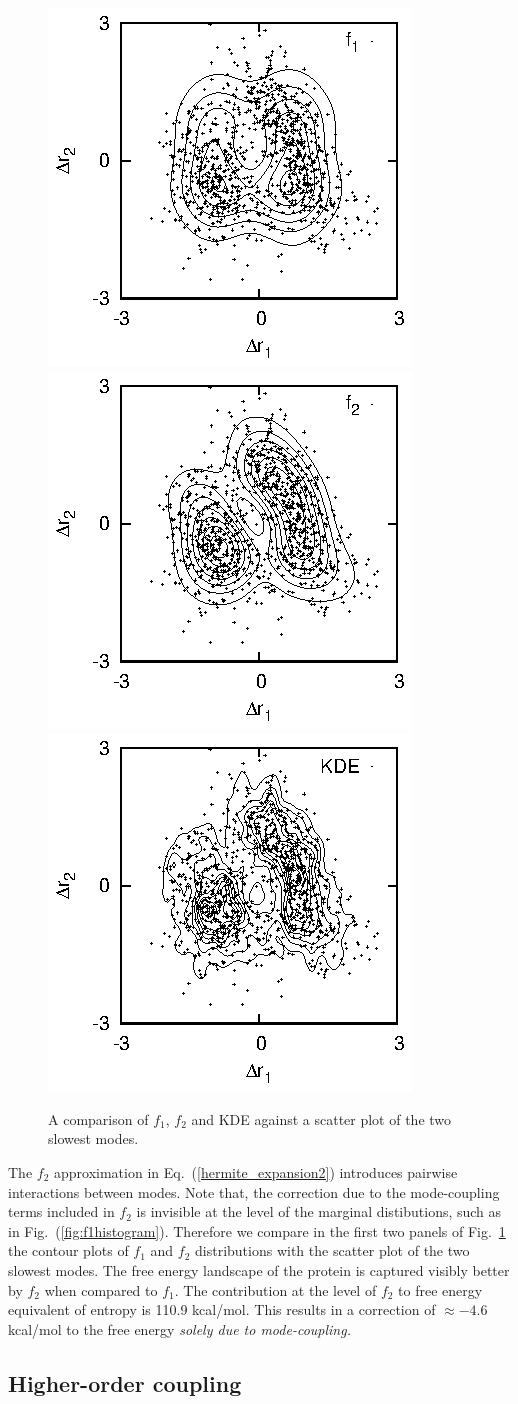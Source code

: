 \documentclass[12pt,article]{iopart}
\begin{document}
\begin{figure}[ht!]\centering
   \includegraphics[width=.30\textwidth]{fig4a.eps}
   \includegraphics[width=.30\textwidth]{fig4b.eps}
   \includegraphics[width=.30\textwidth]{fig4c.eps}
\caption{A comparison of $f_1$, $f_2$ and KDE against a scatter plot of the
  two slowest modes.}
\label{fig:contour}
\end{figure}

The $f_2$ approximation in Eq.~(\ref{hermite_expansion2}) introduces
pairwise interactions between modes. Note that, the correction due to
the mode-coupling terms included in $f_2$ is invisible at the level
of the marginal distibutions, such as in
Fig.~(\ref{fig:f1histogram}). Therefore we compare in the first two
panels of Fig.~\ref{fig:contour} the contour plots of $f_1$ and
$f_2$ distributions with the scatter plot of the two slowest 
modes. The free energy landscape of the protein is captured visibly
better by $f_2$ when compared to $f_1$. The contribution at the level
of $f_2$ to free energy equivalent of entropy is 110.9 kcal/mol. This
results in a correction of $\approx -4.6$ kcal/mol to the free energy
{\it solely due to mode-coupling.}

\subsection{Higher-order coupling}
\end{document}
